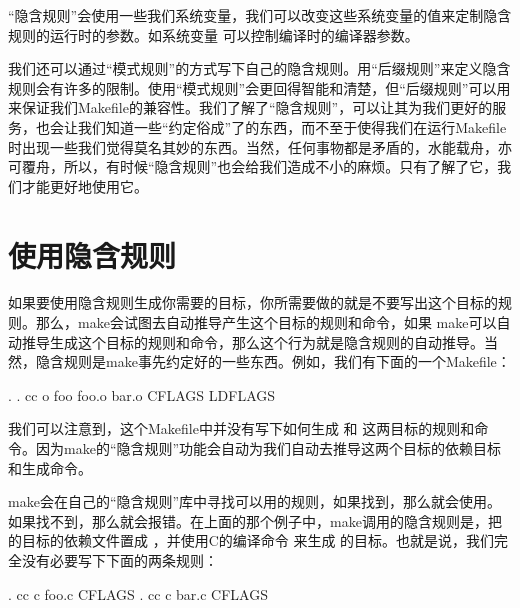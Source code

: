 \documentclass[a4paper,10pt]{sphinxmanual}
\begin{document}
“隐含规则”会使用一些我们系统变量，我们可以改变这些系统变量的值来定制隐含规则的运行时的参数。如系统变量  可以控制编译时的编译器参数。

我们还可以通过“模式规则”的方式写下自己的隐含规则。用“后缀规则”来定义隐含规则会有许多的限制。使用“模式规则”会更回得智能和清楚，但“后缀规则”可以用来保证我们Makefile的兼容性。我们了解了“隐含规则”，可以让其为我们更好的服务，也会让我们知道一些“约定俗成”了的东西，而不至于使得我们在运行Makefile时出现一些我们觉得莫名其妙的东西。当然，任何事物都是矛盾的，水能载舟，亦可覆舟，所以，有时候“隐含规则”也会给我们造成不小的麻烦。只有了解了它，我们才能更好地使用它。


\section{使用隐含规则}
\label{\detokenize{implicit_rules:id2}}
如果要使用隐含规则生成你需要的目标，你所需要做的就是不要写出这个目标的规则。那么，make会试图去自动推导产生这个目标的规则和命令，如果 make可以自动推导生成这个目标的规则和命令，那么这个行为就是隐含规则的自动推导。当然，隐含规则是make事先约定好的一些东西。例如，我们有下面的一个Makefile：

\begin{sphinxVerbatim}[commandchars=\\\{\}]
 . .
    cc \textendash{}o foo foo.o bar.o CFLAGS LDFLAGS
\end{sphinxVerbatim}

我们可以注意到，这个Makefile中并没有写下如何生成  和  这两目标的规则和命令。因为make的“隐含规则”功能会自动为我们自动去推导这两个目标的依赖目标和生成命令。

make会在自己的“隐含规则”库中寻找可以用的规则，如果找到，那么就会使用。如果找不到，那么就会报错。在上面的那个例子中，make调用的隐含规则是，把  的目标的依赖文件置成  ，并使用C的编译命令  来生成  的目标。也就是说，我们完全没有必要写下下面的两条规则：

\begin{sphinxVerbatim}[commandchars=\\\{\}]
 .
    cc \textendash{}c foo.c CFLAGS
 .
    cc \textendash{}c bar.c CFLAGS
\end{sphinxVerbatim}
\end{document}
